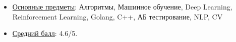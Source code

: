 \begin{itemize}
    \item \underline{Основные предметы}: Алгоритмы, Машинное обучение, Deep Learning, Reinforcement Learning, Golang, C++, АБ тестирование, NLP, CV
    \item \underline{Средний балл}: 4.6/5.
\end{itemize}
